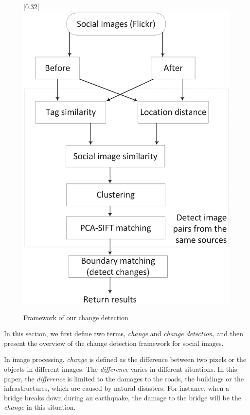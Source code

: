\documentclass[runningheads,a4paper]{llncs}
\begin{document}
\begin{figure}[ht!]\vspace{-4ex}
 \centering
       \scalebox{0.32}[0.32]{\includegraphics{framework.eps}}\vspace{-6ex}
    \caption{\small \vspace{-3ex} Framework of our change detection}
     \label{fig:Frame}
\end{figure}

In this section, we first define two terms, \emph{change} and \emph{change detection}, and then present the overview of the change detection framework for social images.

\begin{definition}\label{def-change}
In image processing, \emph{change} is defined as the difference between two pixels or the objects in different images. The \emph{difference} varies in different situations. In this paper, the \emph{difference} is limited to the damages to the roads, the buildings or the infrastructures, which are caused by natural disasters. For instance, when a bridge breaks down during an earthquake, the damage to the bridge will be the \emph{change} in this situation.
\end{definition}
\end{document}
